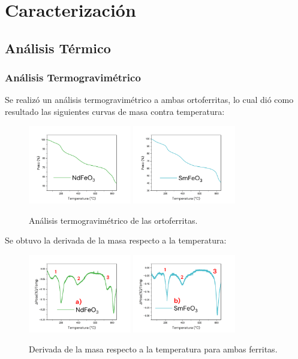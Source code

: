 \documentclass[../main.tex]{subfiles}
\begin{document}
\section{Caracterización}
\subsection{Análisis Térmico} \label{sec:analisistermico}
\subsubsection{Análisis Termogravimétrico} \label{sec:TGA}
Se realizó un análisis termogravimétrico a ambas ortoferritas, lo cual dió como resultado las siguientes curvas de masa contra temperatura:
\begin{figure}[H]
    \centering
    \includegraphics[width=0.4\textwidth]{fig/TGA-NdFeO3.png}
    \quad
    \includegraphics[width=0.4\textwidth]{fig/TGA-SmFeO3.png}
    \caption{Análisis termogravimétrico de las ortoferritas.}
    \label{fig:TGAres}
\end{figure}
Se obtuvo la derivada de la masa respecto a la temperatura:
\begin{figure}[H]
    \centering
    \includegraphics[width=0.4\textwidth]{fig/TGA-derNdFeO3.png}
    \quad
    \includegraphics[width=0.4\textwidth]{fig/TGA-derSmFeO3.png}
    \caption{Derivada de la masa respecto a la temperatura para ambas ferritas.}
    \label{fig:derTGAres}
\end{figure}
\end{document}

